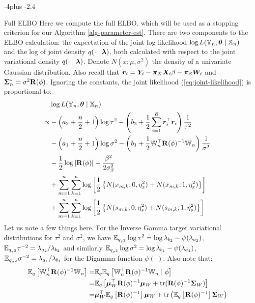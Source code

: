 \documentclass[numsec,webpdf,modern,medium,namedate]{oup-authoring-template}
\makeatletter
\theoremstyle{thmstyleone}%
\theoremstyle{thmstyletwo}%
\theoremstyle{thmstylethree}%
\def\subsection{%
  \@startsection{subsection}{2}{\z@}
  {-4\p@ plus -2\p@}{\if@traditional.4\p@\else2\p@\fi}
  {\reset@font\raggedright\subsecsize}}
\makeatother
\begin{document}
\subsection{Full ELBO}\label{appendix-global-elbo}
Here we compute the full ELBO, which will be used as a stopping criterion for our Algorithm \ref{alg-parameter-est}. There are two components to the ELBO calculation: the expectation of the joint log likelihood $\log L(\mathbb{Y}_n,\boldsymbol{\theta}\mid\mathbb{X}_n)$ and the log of joint density $q(\cdot \mid \boldsymbol{\lambda})$, both calculated with respect to the joint variational density $q(\cdot \mid \boldsymbol{\lambda})$. Denote $N(x; \mu,\sigma^2)$ the density of a univariate Gaussian distribution. Also recall that $\boldsymbol{r}_i = \boldsymbol{Y}_i-\boldsymbol{\pi}_X \boldsymbol{X}_i \beta -\boldsymbol{\pi}_S \boldsymbol{W}_i$ and $\boldsymbol{\Sigma}^\ast_n = \sigma^2 \mathbf{R}(\phi)$. Ignoring the constants, the joint likelihood (\ref{eq:joint-likelihood}) is proportional to:
\begin{equation}
    \begin{split}
        & \log L(\mathbb{Y}_n,\boldsymbol{\theta}\mid\mathbb{X}_n) \\
        \propto & -\left(a_2 + \frac{n}{2} + 1\right)\log \tau^2 -\left(b_2 + \frac{1}{2}\sum_{i=1}^B \boldsymbol{r}_i^\top \boldsymbol{r}_i\right)\frac{1}{\tau^2} \\
        & -\left(a_1 + \frac{n}{2} + 1\right)\log \sigma^2 - \left(b_1 + \frac{1}{2}\mathbb{W}_n^\top \mathbf{R}(\phi)^{-1} \mathbb{W}_n\right)\frac{1}{\sigma^2} \\
        & -\frac{1}{2} \log |\mathbf{R}(\phi)| - \frac{\beta^2}{2\sigma^2_\beta}\\
        &+\sum_{m=1}^{n}\sum_{k=1}^{n} \log \left[\dfrac{1}{2}\left\{N(x_{m,k};0,\eta^2_x) + N(x_{m,k};1,\eta^2_x)\right\}\right]\\
&+\sum_{m=1}^{n}\sum_{k=1}^{n} \log \left[\dfrac{1}{2}\left\{N(s_{m,k};0,\eta^2_s) + N(s_{m,k};1,\eta^2_s)\right\}\right]
    \end{split}
\end{equation}
Let us note a few things here. For the Inverse Gamma target variational distributions for $\tau^2$ and $\sigma^2$, we have $\mathbb{E}_{q_{\tau^2}} \log \tau^2 = \log \lambda_{b_2} - \psi(\lambda_{a_2})$, $\mathbb{E}_{q_{\tau^2}} \tau^{-2} = \lambda_{a_2}/\lambda_{b_2}$ and similarly $\mathbb{E}_{q_{\sigma^2}} \log \sigma^2 = \log \lambda_{b_1} - \psi(\lambda_{a_1})$, $\mathbb{E}_{q_{\sigma^2}} \sigma^{-2} = \lambda_{a_1}/\lambda_{b_1}$ for the Digamma function $\psi(\cdot)$. Also note that:
\begin{equation*}
    \begin{split}
        \mathbb{E}_q \left[\mathbb{W}_n^\top \mathbf{R}(\phi)^{-1} \mathbb{W}_n\right] = & \mathbb{E}_q \mathbb{E}_q \left[\mathbb{W}_n^\top \mathbf{R}(\phi)^{-1} \mathbb{W}_n \mid \phi\right]\\
        = & \mathbb{E}_q\left[\boldsymbol{\mu}_W^\top \mathbf{R}(\phi)^{-1} \boldsymbol{\mu}_W + \mathrm{tr}(\mathbf{R}(\phi)^{-1}\boldsymbol{\Sigma}_W)\right]\\
        = & \boldsymbol{\mu}_W^\top \mathbb{E}_q\left[\mathbf{R}(\phi)^{-1}\right] \boldsymbol{\mu}_W + \mathrm{tr}\left(\mathbb{E}_q\left[\mathbf{R}(\phi)^{-1}\right]\boldsymbol{\Sigma}_W\right)
    \end{split}
\end{equation*}
\end{document}
